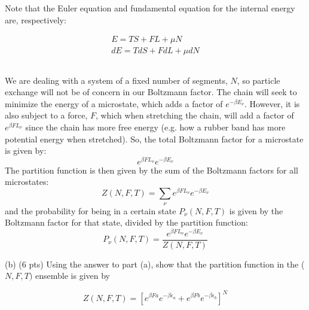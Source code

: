 \documentclass[12pt]{article}
\begin{document}
Note that the Euler equation and fundamental equation for the internal energy are, respectively:

$$
\begin{gathered}
E=T S+F L+\mu N \\
d E=T d S+F d L+\mu d N
\end{gathered}
$$
\subsection{}
We are dealing with a system of a fixed number of segments, $N$, so particle exchange will not be of concern in our Boltzmann factor. The chain will seek to minimize the energy of a microstate, which adds a factor of $e^{-\beta E_{\nu}}$. However, it is also subject to a force, $F$, which when stretching the chain, will add a factor of $e^{\beta F L_{\nu}}$ since the chain has more free energy (e.g. how a rubber band has more potential energy when stretched). So, the total Boltzmann factor for a microstate is given by:
\begin{equation}
  e^{\beta F L_{\nu}} e^{-\beta E_{\nu}}
\end{equation}
The partition function is then given by the sum of the Boltzmann factors for all microstates:
\begin{equation}
  Z(N, F, T) = \sum_{\nu} e^{\beta F L_{\nu}} e^{-\beta E_{\nu}}
\end{equation}
and the probability for being in a certain state $P_{\nu}(N, F, T)$ is given by the Boltzmann factor for that state, divided by the partition function:
\begin{equation}
  P_{\nu}(N, F, T) = \frac{e^{\beta F L_{\nu}} e^{-\beta E_{\nu}}}{Z(N, F, T)}
\end{equation}

(b) (6 pts) Using the answer to part (a), show that the partition function in the ( $N, F, T)$ ensemble is given by

$$
Z(N, F, T)=\left[e^{\beta F a} e^{-\beta \epsilon_{a}}+e^{\beta F b} e^{-\beta \epsilon_{b}}\right]^{N}
$$
\end{document}

